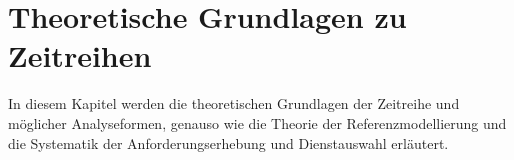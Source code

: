 \chapter{Theoretische Grundlagen zu Zeitreihen}
In diesem Kapitel werden die theoretischen Grundlagen der Zeitreihe und möglicher Analyseformen, genauso wie die Theorie der Referenzmodellierung und die Systematik der Anforderungserhebung und  Dienstauswahl erläutert.









